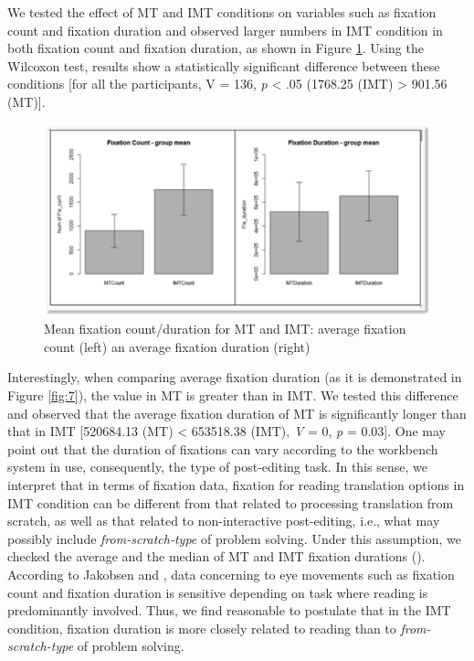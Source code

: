\documentclass[output=paper]{langsci/langscibook}
\begin{document}
We tested the effect of MT and IMT conditions on variables such as fixation count and fixation duration and observed larger numbers in IMT condition in both fixation count and fixation duration, as shown in Figure \ref{fig:6}. Using the Wilcoxon test, results show a statistically significant difference between these conditions [for all the participants, V = 136, \textit{p} {\textless} .05 (1768.25 (IMT) {\textgreater} 901.56 (MT)].


\begin{figure}
 \includegraphics[width=\textwidth]{figures/Sarto6.png}
 \caption{Mean fixation count/duration for MT and IMT: average fixation count (left) an average fixation duration (right)}
 \label{fig:6}
\end{figure} 



Interestingly, when comparing average fixation duration (as it is demonstrated in Figure \ref{fig:7}), the value in MT is greater than in IMT. We tested this difference and observed that the average fixation duration of MT is significantly longer than that in IMT [520684.13 (MT) {\textless} 653518.38 (IMT), \textit{V} = 0, \textit{p} = 0.03]. One may point out that the duration of fixations can vary according to the workbench system in use, consequently, the type of post-editing task. In this sense, we interpret that in terms of fixation data, fixation for reading translation options in IMT condition can be different from that related to processing translation from scratch, as well as that related to non-interactive post-editing, i.e., what may possibly include \textit{from-scratch-type} of problem solving. Under this assumption, we checked the average and the median of MT and IMT fixation durations (). According to Jakobsen and \citet{Jensen2008}, data concerning to eye movements such as fixation count and fixation duration is sensitive depending on task where reading is predominantly involved. Thus, we find reasonable to postulate that in the IMT condition, fixation duration is more closely related to reading than to \textit{from-scratch-type} of problem solving. 
\end{document}
